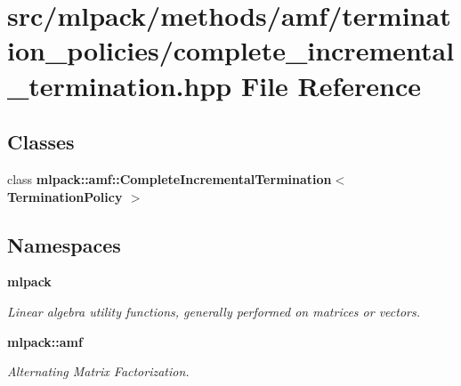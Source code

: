 \section{src/mlpack/methods/amf/termination\-\_\-policies/complete\-\_\-incremental\-\_\-termination.hpp File Reference}
\label{complete__incremental__termination_8hpp}
\subsection*{Classes}
\begin{DoxyCompactItemize}
\item 
class {\bf mlpack\-::amf\-::\-Complete\-Incremental\-Termination$<$ Termination\-Policy $>$}
\end{DoxyCompactItemize}
\subsection*{Namespaces}
\begin{DoxyCompactItemize}
\item 
{\bf mlpack}
\begin{DoxyCompactList}\small\item\em Linear algebra utility functions, generally performed on matrices or vectors. \end{DoxyCompactList}\item 
{\bf mlpack\-::amf}
\begin{DoxyCompactList}\small\item\em Alternating Matrix Factorization. \end{DoxyCompactList}\end{DoxyCompactItemize}
